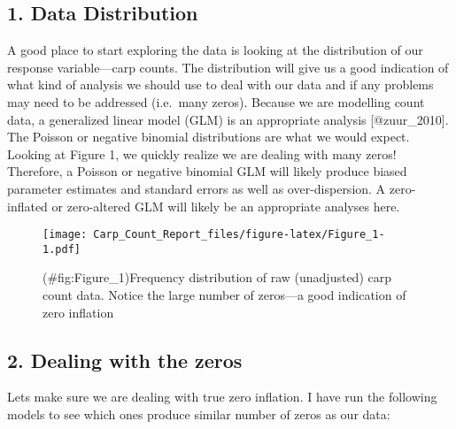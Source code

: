 \documentclass[]{article}
\begin{document}
\subsection{1. Data Distribution}\label{data-distribution}

A good place to start exploring the data is looking at the distribution
of our response variable---carp counts. The distribution will give us a
good indication of what kind of analysis we should use to deal with our
data and if any problems may need to be addressed (i.e.~many zeros).
Because we are modelling count data, a generalized linear model (GLM) is
an appropriate analysis {[}@zuur\_2010{]}. The Poisson or negative
binomial distributions are what we would expect. Looking at Figure 1, we
quickly realize we are dealing with many zeros! Therefore, a Poisson or
negative binomial GLM will likely produce biased parameter estimates and
standard errors as well as over-dispersion. A zero-inflated or
zero-altered GLM will likely be an appropriate analyses here.

\begin{figure}[htbp]
\centering
\texttt{[image: Carp\_Count\_Report\_files/figure-latex/Figure\_1-1.pdf]}
\caption{(\#fig:Figure\_1)Frequency distribution of raw (unadjusted)
carp count data. Notice the large number of zeros---a good indication of
zero inflation}
\end{figure}

\subsection{2. Dealing with the zeros}\label{dealing-with-the-zeros}

Lets make sure we are dealing with true zero inflation. I have run the
following models to see which ones produce similar number of zeros as
our data:
\end{document}

